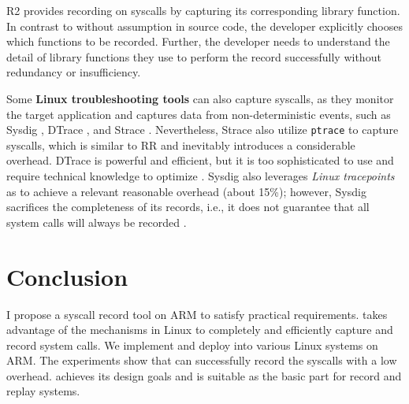 
R2 \cite{guo_r2_2008} provides recording on syscalls by capturing its corresponding library function. In contrast to \TheName without assumption in source code, the developer explicitly chooses which functions to be recorded. Further, the developer needs to understand the detail of library functions they use to perform the record successfully without redundancy or insufficiency. 


Some \textbf{Linux troubleshooting tools} can also capture syscalls, as they monitor the target application and captures data
from non-deterministic events, such as Sysdig \cite{github_sysdig_2021}, DTrace
\cite{gregg_dtrace_2019,gregg_dtrace_2011}, and Strace \cite{github_strace_2021}.
Nevertheless, Strace \cite{github_strace_2021} also utilize \texttt{ptrace} to capture syscalls, which is similar to RR and inevitably introduces a considerable overhead. DTrace is powerful and efficient, but it is too sophisticated to use and require technical knowledge to optimize \cite{gregg_dtrace_2011}. Sysdig also leverages \textit{Linux tracepoints} as \TheName to achieve a relevant reasonable overhead (about 15\%); however, Sysdig sacrifices the completeness of its records, i.e., it does not guarantee that all system calls will always be recorded \cite{degioanni_sysdig_2014}.





\section{Conclusion}

I propose a syscall record tool \TheName on ARM to satisfy practical requirements. \TheName takes advantage of the mechanisms in Linux to completely and efficiently capture and record system calls. We implement and deploy \TheName into various Linux systems on ARM. The experiments show that \TheName can successfully record the syscalls with a low overhead.
\TheName achieves its design goals and is suitable as the basic part for record and replay systems. 